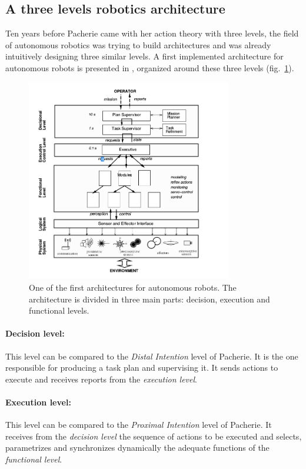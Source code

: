 \documentclass[english,a4paper,11pt,twoside]{StyleThese}
\begin{document}
\subsection{A three levels robotics architecture}

\label{subsec:Archi}

Ten years before Pacherie came with her action theory with three levels, the field of autonomous robotics was trying to build architectures and was already intuitively designing three similar levels. A first implemented architecture for autonomous robots is presented in \cite{alami1998architecture}, organized around these three levels (fig.~\ref{fig:FirstArchi}).

\begin{figure}[!h]
	\centering
    \includegraphics[width=0.8\textwidth]{figs/Chapter1/ArchitectureHold.png}
    \caption{One of the first architectures for autonomous robots. The architecture is divided in three main parts: decision, execution and functional levels.}
    \label{fig:FirstArchi}
\end{figure}

\paragraph{Decision level:}
This level can be compared to the \textit{Distal Intention} level of Pacherie. It is the one responsible for producing a task plan and supervising it. It sends actions to execute and receives reports from the \textit{execution level}.

\paragraph{Execution level:}
This level can be compared to the \textit{Proximal Intention} level of Pacherie. It receives from the \textit{decision level} the sequence of actions to be executed and selects, parametrizes and synchronizes dynamically the adequate functions of the \textit{functional level}.
\end{document}
